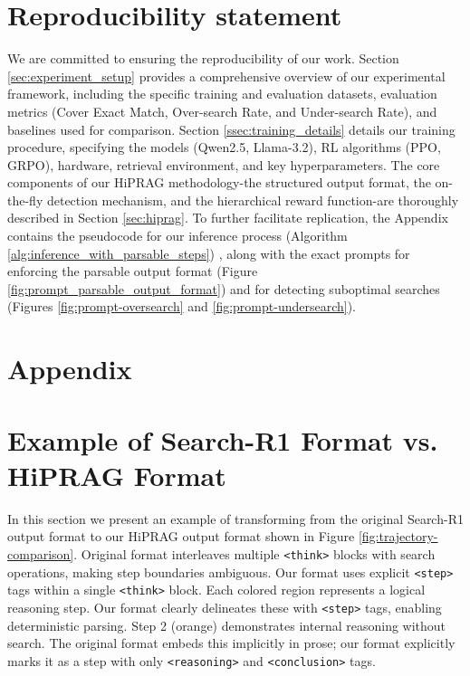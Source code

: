 \documentclass{article}
\begin{document}
\section*{Reproducibility statement}
We are committed to ensuring the reproducibility of our work. Section \ref{sec:experiment_setup} provides a comprehensive overview of our experimental framework, including the specific training and evaluation datasets, evaluation metrics (Cover Exact Match, Over-search Rate, and Under-search Rate), and baselines used for comparison. Section \ref{ssec:training_details} details our training procedure, specifying the models (Qwen2.5, Llama-3.2), RL algorithms (PPO, GRPO), hardware, retrieval environment, and key hyperparameters. The core components of our HiPRAG methodology-the structured output format, the on-the-fly detection mechanism, and the hierarchical reward function-are thoroughly described in Section \ref{sec:hiprag}. To further facilitate replication, the Appendix contains the pseudocode for our inference process (Algorithm \ref{alg:inference_with_parsable_steps}) , along with the exact prompts for enforcing the parsable output format (Figure \ref{fig:prompt_parsable_output_format}) and for detecting suboptimal searches (Figures \ref{fig:prompt-oversearch} and \ref{fig:prompt-undersearch}).


\appendix
\clearpage
\section*{Appendix}
\section{Example of Search-R1 Format vs. HiPRAG Format}
\label{sec:example_of_search_r1_format_vs_hiprag_format}


In this section we present an example of transforming from the original Search-R1 output format to our HiPRAG output format shown in Figure \ref{fig:trajectory-comparison}. Original format interleaves multiple \texttt{<think>} blocks with search operations, making step boundaries ambiguous. Our format uses explicit \texttt{<step>} tags within a single \texttt{<think>} block. Each colored region represents a logical reasoning step. Our format clearly delineates these with \texttt{<step>} tags, enabling deterministic parsing. Step 2 (orange) demonstrates internal reasoning without search. The original format embeds this implicitly in prose; our format explicitly marks it as a step with only \texttt{<reasoning>} and \texttt{<conclusion>} tags.
\end{document}
